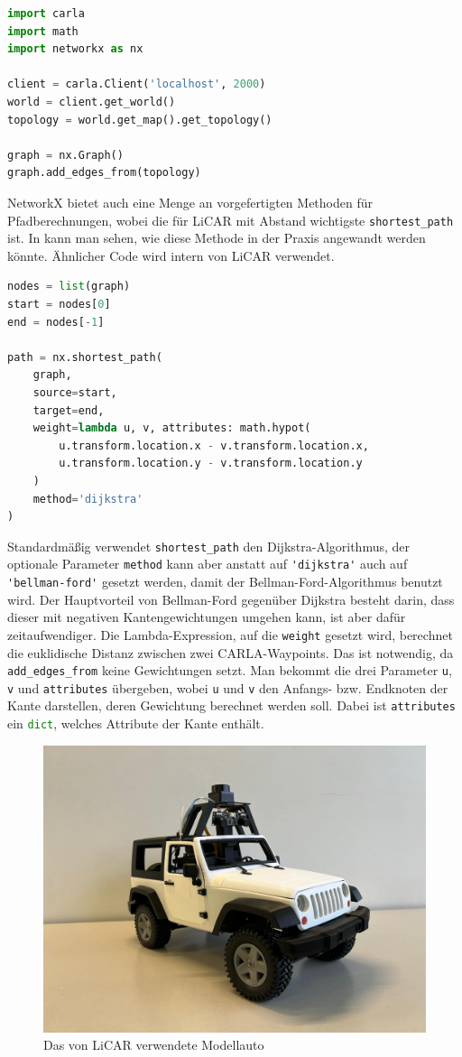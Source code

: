         \begin{lstlisting}[language=Python, caption=Erzeugung eines Graphen aus einer CARLA-Map, label=lst:carla-graph]
import carla
import math
import networkx as nx

client = carla.Client('localhost', 2000)
world = client.get_world()
topology = world.get_map().get_topology()

graph = nx.Graph()
graph.add_edges_from(topology)
        \end{lstlisting}

        NetworkX bietet auch eine Menge an vorgefertigten Methoden für Pfadberechnungen, wobei die für LiCAR mit Abstand wichtigste \lstinline{shortest_path} ist. In  kann man sehen, wie diese Methode in der Praxis angewandt werden könnte. Ähnlicher Code wird intern von LiCAR verwendet.

        \begin{lstlisting}[language=Python, caption=Berechnung des kürzesten Pfades mittels NetworkX, label=lst:nx]
nodes = list(graph)
start = nodes[0]
end = nodes[-1]

path = nx.shortest_path(
    graph,
    source=start,
    target=end,
    weight=lambda u, v, attributes: math.hypot(
        u.transform.location.x - v.transform.location.x,
        u.transform.location.y - v.transform.location.y
    )
    method='dijkstra'
)
        \end{lstlisting}

        Standardmäßig verwendet \lstinline{shortest_path} den Dijkstra-Algorithmus, der optionale Parameter \lstinline{method} kann aber anstatt auf \lstinline{'dijkstra'} auch auf \lstinline{'bellman-ford'} gesetzt werden, damit der Bellman-Ford-Algorithmus benutzt wird. Der Hauptvorteil von Bellman-Ford gegenüber Dijkstra besteht darin, dass dieser mit negativen Kantengewichtungen umgehen kann, ist aber dafür zeitaufwendiger. Die Lambda-Expression, auf die \lstinline{weight} gesetzt wird, berechnet die euklidische Distanz zwischen zwei CARLA-Waypoints. Das ist notwendig, da \lstinline{add_edges_from} keine Gewichtungen setzt. Man bekommt die drei Parameter \lstinline{u}, \lstinline{v} und \lstinline{attributes} übergeben, wobei \lstinline{u} und \lstinline{v} den Anfangs- bzw. Endknoten der Kante darstellen, deren Gewichtung berechnet werden soll. Dabei ist \lstinline{attributes} ein \lstinline[language=Python]{dict}, welches Attribute der Kante enthält.

        \begin{figure}
            \centering
            \includegraphics[width=0.5\linewidth]{images/car.jpg}
            \caption{Das von LiCAR verwendete Modellauto}
            \label{fig:car}
        \end{figure}
